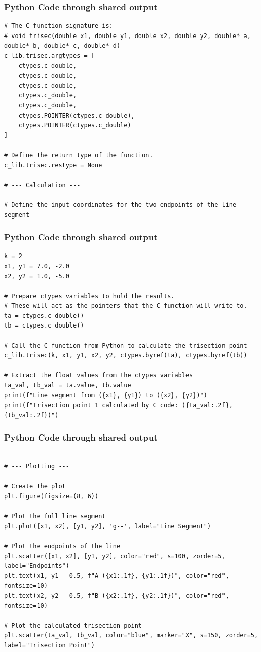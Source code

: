 \documentclass{beamer}
\begin{document}
\begin{frame}[fragile]
\frametitle{Python Code through shared output}
\begin{lstlisting}
# The C function signature is:
# void trisec(double x1, double y1, double x2, double y2, double* a, double* b, double* c, double* d)
c_lib.trisec.argtypes = [
    ctypes.c_double, 
    ctypes.c_double, 
    ctypes.c_double,
    ctypes.c_double, 
    ctypes.c_double, 
    ctypes.POINTER(ctypes.c_double), 
    ctypes.POINTER(ctypes.c_double)
]

# Define the return type of the function.
c_lib.trisec.restype = None

# --- Calculation ---

# Define the input coordinates for the two endpoints of the line segment
\end{lstlisting}
    
\end{frame}

\begin{frame}[fragile]
\frametitle{Python Code through shared output}
\begin{lstlisting}
k = 2
x1, y1 = 7.0, -2.0
x2, y2 = 1.0, -5.0

# Prepare ctypes variables to hold the results.
# These will act as the pointers that the C function will write to.
ta = ctypes.c_double()
tb = ctypes.c_double()

# Call the C function from Python to calculate the trisection point
c_lib.trisec(k, x1, y1, x2, y2, ctypes.byref(ta), ctypes.byref(tb))

# Extract the float values from the ctypes variables
ta_val, tb_val = ta.value, tb.value
print(f"Line segment from ({x1}, {y1}) to ({x2}, {y2})")
print(f"Trisection point 1 calculated by C code: ({ta_val:.2f}, {tb_val:.2f})")
\end{lstlisting}
    
\end{frame}

\begin{frame}[fragile]
\frametitle{Python Code through shared output}
\begin{lstlisting}

# --- Plotting ---

# Create the plot
plt.figure(figsize=(8, 6))

# Plot the full line segment
plt.plot([x1, x2], [y1, y2], 'g--', label="Line Segment")

# Plot the endpoints of the line
plt.scatter([x1, x2], [y1, y2], color="red", s=100, zorder=5, label="Endpoints")
plt.text(x1, y1 - 0.5, f"A ({x1:.1f}, {y1:.1f})", color="red", fontsize=10)
plt.text(x2, y2 - 0.5, f"B ({x2:.1f}, {y2:.1f})", color="red", fontsize=10)

# Plot the calculated trisection point
plt.scatter(ta_val, tb_val, color="blue", marker="X", s=150, zorder=5, label="Trisection Point")
\end{lstlisting}
\end{frame}
\end{document}
